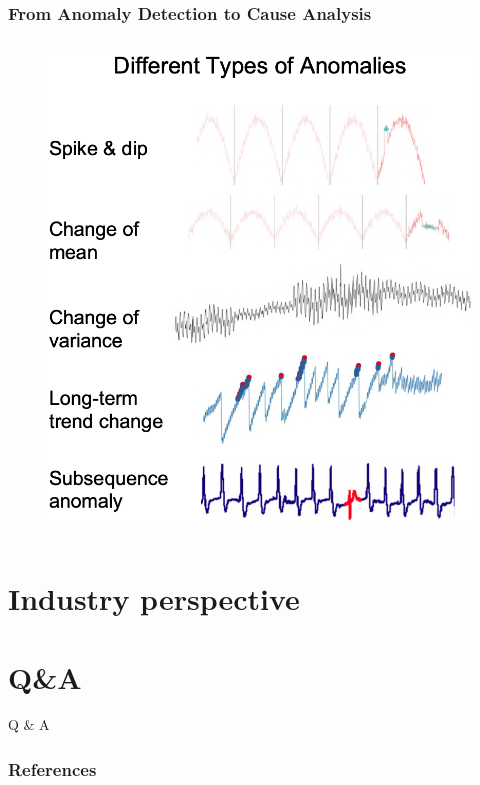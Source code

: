 \documentclass[aspectratio=169,xcolor=x11names,table]{beamer}
\begin{document}
\begin{frame}
	\frametitle{From Anomaly Detection to Cause Analysis}
	\begin{columns}
		\begin{column}{0.4\linewidth}
			\begin{figure}
				\centering
				\includegraphics[width=\columnwidth]{anomaly}
			\end{figure}
		\end{column}
	\end{columns}
\end{frame}

\section{Industry perspective}

\section{Q\&A}
\begin{frame}
	\center
	\Huge Q \& A
\end{frame}

\begin{frame}[t,allowframebreaks]
	\frametitle{References}
	\tiny
	\printbibliography
\end{frame}
\end{document}
